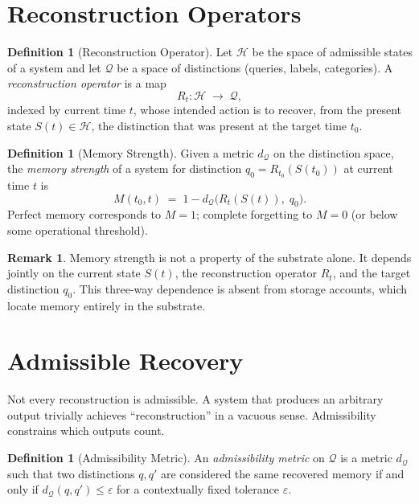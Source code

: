 \documentclass[12pt, oneside]{book}
\theoremstyle{plain}
\theoremstyle{definition}
\newtheorem{definition}[theorem]{Definition}
\newtheorem{remark}[theorem]{Remark}
\theoremstyle{remark}
\newcommand{\calH}{\mathcal{H}}
\newcommand{\calQ}{\mathcal{Q}}
\begin{document}
\section{Reconstruction Operators}

\begin{definition}[Reconstruction Operator]
Let $\calH$ be the space of admissible states of a system
and let $\calQ$ be a space of distinctions (queries, labels,
categories).
A \emph{reconstruction operator} is a map
\[
  R_t : \calH \;\longrightarrow\; \calQ,
\]
indexed by current time $t$, whose intended action is to
recover, from the present state $S(t) \in \calH$, the
distinction that was present at the target time $t_0$.
\end{definition}

\begin{definition}[Memory Strength]
\label{def:mem-strength}
Given a metric $d_{\calQ}$ on the distinction space,
the \emph{memory strength} of a system for distinction
$q_0 = R_{t_0}(S(t_0))$ at current time $t$ is
\[
  M(t_0, t)
  \;=\;
  1 - d_{\calQ}\!\bigl(R_t(S(t)),\; q_0\bigr).
\]
Perfect memory corresponds to $M = 1$; complete forgetting
to $M = 0$ (or below some operational threshold).
\end{definition}

\begin{remark}
Memory strength is not a property of the substrate alone.
It depends jointly on the current state $S(t)$,
the reconstruction operator $R_t$,
and the target distinction $q_0$.
This three-way dependence is absent from storage accounts,
which locate memory entirely in the substrate.
\end{remark}

\section{Admissible Recovery}

Not every reconstruction is admissible.
A system that produces an arbitrary output trivially
achieves ``reconstruction'' in a vacuous sense.
Admissibility constrains which outputs count.

\begin{definition}[Admissibility Metric]
\label{def:admissibility-metric}
An \emph{admissibility metric} on $\calQ$ is a metric
$d_{\calQ}$ such that two distinctions $q, q'$
are considered the same recovered memory if and only if
$d_{\calQ}(q, q') \leq \varepsilon$ for a contextually
fixed tolerance $\varepsilon$.
\end{definition}
\end{document}

